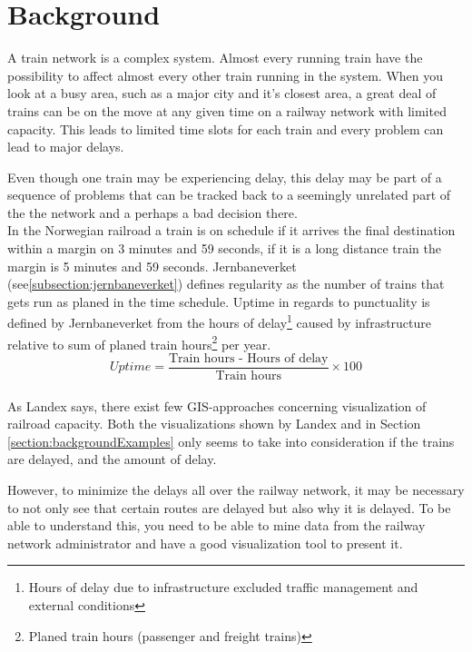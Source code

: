 
\chapter{Background}
\label{chapter:background}

A train network is a complex system. Almost every running train have the 
possibility to affect almost every other train running in the system.  When 
you look at a busy area, such as a major city and it's closest
area, a great deal of trains can be on the move at any given time on a
railway network with limited capacity. This leads to limited time slots for each 
train and every problem can lead to major delays.


Even though one train may be experiencing delay, this delay may be part of a
sequence of problems that can be tracked back to a seemingly unrelated part of
the the network and a perhaps a bad decision there\cite{cule2011mining}. \\

In the Norwegian railroad a train is on schedule if it arrives the final
destination within a margin on 3 minutes and 59 seconds, if it is a long
distance train the margin is 5 minutes and 59 seconds. 
Jernbaneverket (see\vref{subsection:jernbaneverket}) defines regularity as the number of trains that gets run as 
planed in the time schedule. 
Uptime in regards to punctuality is defined by Jernbaneverket from the hours of delay\footnote{Hours of delay due to infrastructure excluded traffic	management and external conditions} caused by infrastructure relative to sum of planed train hours\footnote{Planed train hours (passenger and freight trains)} per year.
\cite{jernbaneverketPunklighetsTall}
\begin{equation} Uptime =
		\frac
				{
					\text{Train hours - Hours of delay}
				}
				{
					\text{Train hours}
				}\times 100 
\end{equation}\\

As Landex\cite{landex2009gis} says, there exist few GIS-approaches concerning
visualization of railroad capacity. Both the visualizations shown by Landex and
in Section \vref{section:backgroundExamples} only seems to take into consideration if
the trains are delayed, and the amount of delay. 

However, to minimize the delays all over the railway network, it may be necessary
to not only see that certain routes are delayed but also why it is delayed. To
be able to understand this, you need to be able to mine data from the railway
network administrator and have a good visualization tool to present it. 

